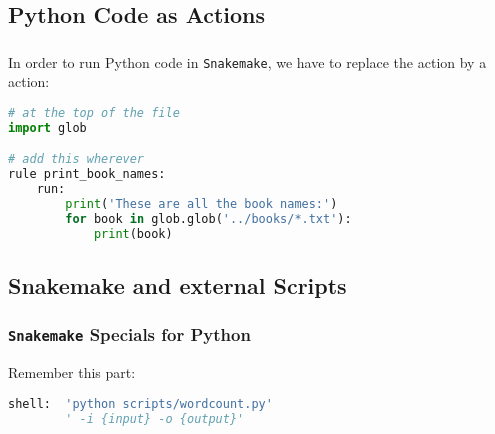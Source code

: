 \subsection{Python Code as Actions}

\begin{frame}[fragile]
  \frametitle{}
  \vspace{-0.5em}
  In order to run Python code in \texttt{Snakemake}, we have to replace the  action by a  action:\vspace{-0.5em}
  \vspace{-0.5em}
  \begin{lstlisting}[language=Python,style=Python, basicstyle=\footnotesize]
# at the top of the file
import glob

# add this wherever
rule print_book_names:
    run:
        print('These are all the book names:')
        for book in glob.glob('../books/*.txt'):
            print(book)

  \end{lstlisting}\vspace{-0.5em}
  \pause\footnotesize
\end{frame}

\subsection{Snakemake and external Scripts}

\begin{frame}[fragile]
  \frametitle{\texttt{Snakemake} Specials for Python}
  Remember this part:
  \begin{lstlisting}[language=Python,style=Python]
shell:  'python scripts/wordcount.py'
        ' -i {input} -o {output}'
  \end{lstlisting}
\end{frame}


